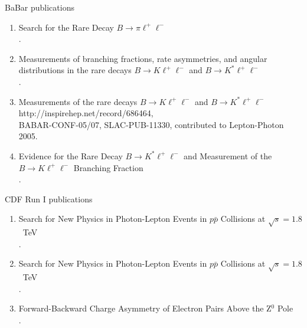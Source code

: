 \documentclass [12pt]{report}
\begin{document}
BaBar publications 

\begin{enumerate}

\item Search for the Rare Decay $B\rightarrow \pi\ell^+\ell^-$\\
.

\item Measurements of branching fractions, rate asymmetries, and angular distributions in the rare decays $B\rightarrow K\ell^+\ell^-$ and $B\rightarrow K^{*}\ell^+\ell^-$\\
.

\item Measurements of the rare decays $B\rightarrow K\ell^+\ell^-$ and $B\rightarrow K^{*}\ell^+\ell^-$\\
{http://inspirehep.net/record/686464}, \\ BABAR-CONF-05/07, SLAC-PUB-11330, contributed to Lepton-Photon 2005.

\item Evidence for the Rare Decay $B\rightarrow K^{*} \ell^+\ell^-$ and Measurement of the $B\rightarrow K\ell^+\ell^-$ Branching Fraction \\
.

\end{enumerate}

CDF Run I publications

\begin{enumerate}

\item Search for New Physics in Photon-Lepton Events in $p\bar{p}$ Collisions at $\sqrt{s} = 1.8$~TeV\\
.

\item Search for New Physics in Photon-Lepton Events in $p\bar{p}$ Collisions at $\sqrt{s} = 1.8$~TeV\\
.

\item Forward-Backward Charge Asymmetry of Electron Pairs Above the Z$^0$ Pole\\
.

\end{enumerate}
 
\end{document}
